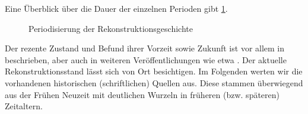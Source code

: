 Eine Überblick über die Dauer der einzelnen Perioden gibt \cref{fig:perioden}.

\begin{figure}
    \centering
        
    \caption{Periodisierung der Rekonstruktionsgeschichte}
    \label{fig:perioden}
\end{figure}

Der rezente Zustand und Befund ihrer Vorzeit sowie Zukunft ist vor allem in \cite{cbasebook} beschrieben, aber auch in weiteren Veröffentlichungen wie etwa \cite{cbasewebsite}. Der aktuelle Rekonstruktionsstand lässt sich von Ort besichtigen. Im Folgenden werten wir die vorhandenen historischen (schriftlichen) Quellen  aus. Diese stammen überwiegend aus der Frühen Neuzeit mit deutlichen Wurzeln in früheren (bzw. späteren) Zeitaltern.

